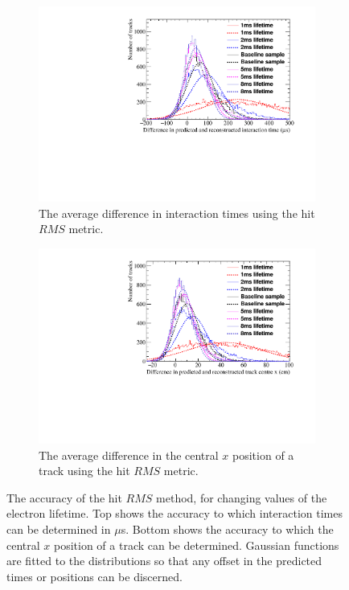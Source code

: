 \begin{figure}
  \centering
  \begin{subfigure}{0.6\textwidth}
    \centering
    \includegraphics[width=\textwidth]{Canvas_AvDiff_T_RMS_ElecLifetime}
    \caption{The average difference in interaction times using the hit $RMS$ metric.}
    \label{fig:DiffLifeStudy_AvDiffRMS_T}
  \end{subfigure}
  \begin{subfigure}{0.6\textwidth}
    \centering
    \includegraphics[width=\textwidth]{Canvas_AvDiff_X_RMS_ElecLifetime}
    \caption{The average difference in the central $x$ position of a track using the hit $RMS$ metric.}
    \label{fig:DiffLifeStudy_AvDiffRMS_X}
  \end{subfigure}
  \caption[Comparing the accuracy of the hit $RMS$ method, as the electron lifetime changes]
          {The accuracy of the hit $RMS$ method, for changing values of the electron lifetime. Top shows the accuracy to which interaction times can be determined in $\mu$s. Bottom shows the accuracy to which the central $x$ position of a track can be determined. Gaussian functions are fitted to the distributions so that any offset in the predicted times or positions can be discerned.}
  \label{fig:DiffLifeStudy_AvDiff_RMS}
\end{figure}

